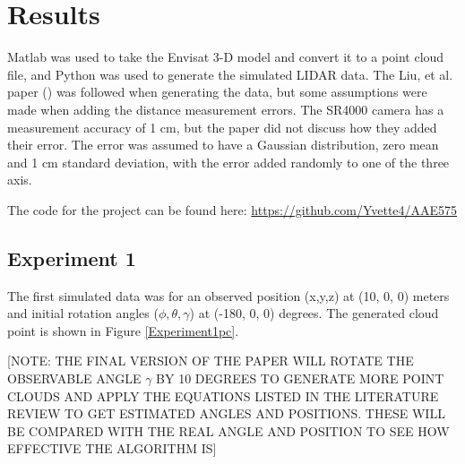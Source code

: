 \documentclass[conference]{IEEEtran}
\begin{document}


	\section{Results}
		Matlab was used to take the Envisat 3-D model and convert it to a point cloud file, and Python was used to generate the simulated LIDAR data. The Liu, et al. paper (\cite{liu2016point}) was followed when generating the data, but some assumptions were made when adding the distance measurement errors. The SR4000 camera has a measurement accuracy of 1 cm, but the paper did not discuss how they added their error. The error was assumed to have a Gaussian distribution, zero mean and 1 cm standard deviation, with the error added randomly to one of the three axis.
		
		The code for the project can be found here: \url{https://github.com/Yvette4/AAE575}
		
	\subsection{Experiment 1}
		The first simulated data was for an observed position (x,y,z) at (10, 0, 0) meters and initial rotation angles ($\phi, \theta, \gamma$) at (-180, 0, 0) degrees. The generated cloud point is shown in Figure \ref{Experiment1pc}.
		
		[NOTE: THE FINAL VERSION OF THE PAPER WILL ROTATE THE OBSERVABLE ANGLE $\gamma$ BY 10 DEGREES TO GENERATE MORE POINT CLOUDS AND APPLY THE EQUATIONS LISTED IN THE LITERATURE REVIEW TO GET ESTIMATED ANGLES AND POSITIONS. THESE WILL BE COMPARED WITH THE REAL ANGLE AND POSITION TO SEE HOW EFFECTIVE THE ALGORITHM IS] 
		
\end{document}
